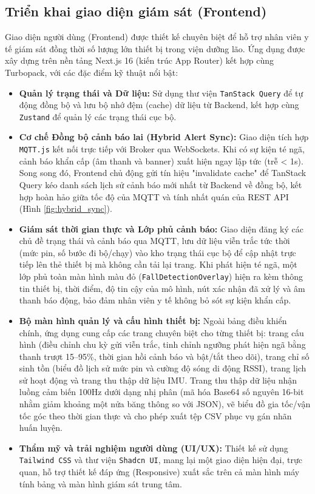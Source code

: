 \documentclass[../DoAn.tex]{subfiles}
\begin{document}
\subsection{Triển khai giao diện giám sát (Frontend)}
Giao diện người dùng (Frontend) được thiết kế chuyên biệt để hỗ trợ nhân viên y tế giám sát đồng thời số lượng lớn thiết bị trong viện dưỡng lão. Ứng dụng được xây dựng trên nền tảng Next.js 16 (kiến trúc App Router) kết hợp cùng Turbopack, với các đặc điểm kỹ thuật nổi bật:
\begin{itemize}
    \item \textbf{Quản lý trạng thái và Dữ liệu:} Sử dụng thư viện \texttt{TanStack Query} để tự động đồng bộ và lưu bộ nhớ đệm (cache) dữ liệu từ Backend, kết hợp cùng \texttt{Zustand} để quản lý các trạng thái cục bộ.
    \item \textbf{Cơ chế Đồng bộ cảnh báo lai (Hybrid Alert Sync):} Giao diện tích hợp \texttt{MQTT.js} kết nối trực tiếp với Broker qua WebSockets. Khi có sự kiện té ngã, cảnh báo khẩn cấp (âm thanh và banner) xuất hiện ngay lập tức (trễ < 1s). Song song đó, Frontend chủ động gửi tín hiệu "invalidate cache" để TanStack Query kéo danh sách lịch sử cảnh báo mới nhất từ Backend về đồng bộ, kết hợp hoàn hảo giữa tốc độ của MQTT và tính nhất quán của REST API (Hình \ref{fig:hybrid_sync}).
    \item \textbf{Giám sát thời gian thực và Lớp phủ cảnh báo:} Giao diện đăng ký các chủ đề trạng thái và cảnh báo qua MQTT, lưu dữ liệu viễn trắc tức thời (mức pin, số bước đi bộ/chạy) vào kho trạng thái cục bộ để cập nhật trực tiếp lên thẻ thiết bị mà không cần tải lại trang. Khi phát hiện té ngã, một lớp phủ toàn màn hình màu đỏ (\texttt{FallDetectionOverlay}) hiện ra kèm thông tin thiết bị, thời điểm, độ tin cậy của mô hình, nút xác nhận đã xử lý và âm thanh báo động, bảo đảm nhân viên y tế không bỏ sót sự kiện khẩn cấp.
    \item \textbf{Bộ màn hình quản lý và cấu hình thiết bị:} Ngoài bảng điều khiển chính, ứng dụng cung cấp các trang chuyên biệt cho từng thiết bị: trang cấu hình (điều chỉnh chu kỳ gửi viễn trắc, tinh chỉnh ngưỡng phát hiện ngã bằng thanh trượt 15--95\%, thời gian hồi cảnh báo và bật/tắt theo dõi), trang chỉ số sinh tồn (biểu đồ lịch sử mức pin và cường độ sóng di động RSSI), trang lịch sử hoạt động và trang thu thập dữ liệu IMU. Trang thu thập dữ liệu nhận luồng cảm biến 100Hz dưới dạng nhị phân (mã hóa Base64 số nguyên 16-bit nhằm giảm khoảng một nửa băng thông so với JSON), vẽ biểu đồ gia tốc/vận tốc góc theo thời gian thực và cho phép xuất tệp CSV phục vụ gán nhãn huấn luyện.
    \item \textbf{Thẩm mỹ và trải nghiệm người dùng (UI/UX):} Thiết kế sử dụng \texttt{Tailwind CSS} và thư viện \texttt{Shadcn UI}, mang lại một giao diện hiện đại, trực quan, hỗ trợ thiết kế đáp ứng (Responsive) xuất sắc trên cả màn hình máy tính bảng và màn hình giám sát trung tâm.
\end{itemize}
\end{document}
